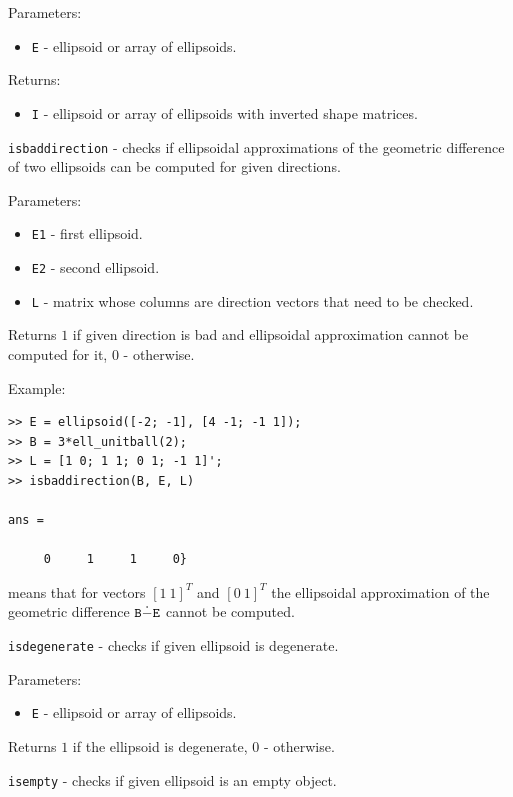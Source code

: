 \documentclass{report}
\begin{document}
Parameters:
\begin{itemize}
\item {\tt E} - ellipsoid or array of ellipsoids.
\end{itemize}

Returns:
\begin{itemize}
\item {\tt I} - ellipsoid or array of ellipsoids with inverted shape matrices.
\end{itemize}

\newpage

{\Large {\tt isbaddirection}} - checks if ellipsoidal approximations of
the geometric difference of two ellipsoids can be computed for given
directions.

Parameters:
\begin{itemize}
\item {\tt E1} - first ellipsoid.
\item {\tt E2} - second ellipsoid.
\item {\tt L} - matrix whose columns are direction vectors that need to be
checked.
\end{itemize}

Returns $1$ if given direction is bad and ellipsoidal approximation cannot
be computed for it, $0$ - otherwise.

Example:
{\tt \begin{verbatim}
>> E = ellipsoid([-2; -1], [4 -1; -1 1]);
>> B = 3*ell_unitball(2);
>> L = [1 0; 1 1; 0 1; -1 1]';
>> isbaddirection(B, E, L)

ans =

     0     1     1     0}
\end{verbatim} }
means that for vectors $[1 ~ 1]^T$ and $[0 ~ 1]^T$ the ellipsoidal approximation
of the geometric difference ${\tt B}\dot{-}{\tt E}$ cannot be computed.

\newpage

{\Large {\tt isdegenerate}} - checks if given ellipsoid is degenerate.

Parameters:
\begin{itemize}
\item {\tt E} - ellipsoid or array of ellipsoids.
\end{itemize}

Returns $1$ if the ellipsoid is degenerate, $0$ - otherwise.

\newpage

{\Large {\tt isempty}} - checks if given ellipsoid is an empty object.
\end{document}
